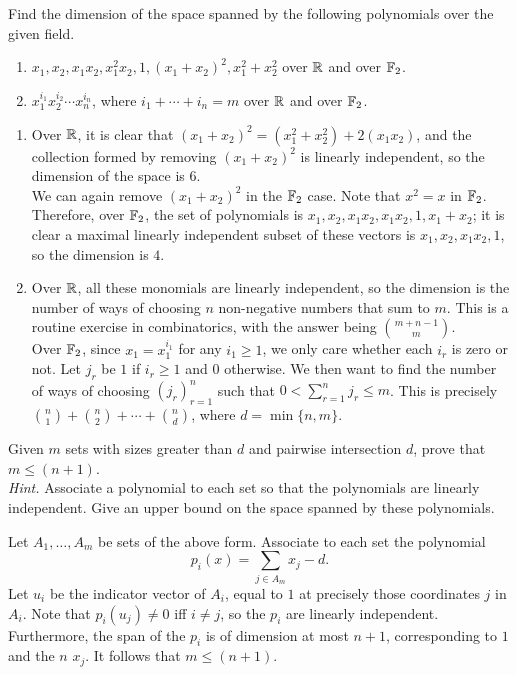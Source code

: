\documentclass{article}
\begin{document}
	\begin{exercise}
		\label{ex:2.1}
		Find the dimension of the space spanned by the following polynomials over the given field.
		\begin{enumerate}[label=(\alph*)]
			\item $x_1, x_2, x_1x_2, x_1^2x_2, 1, (x_1+x_2)^2, x_1^2+x_2^2$ over $\mathbb{R}$ and over $\mathbb{F}_2$.
			\item $x_1^{i_1}x_2^{i_2}\cdots x_n^{i_n}$, where $i_1 + \cdots + i_n = m$ over $\mathbb{R}$ and over $\mathbb{F}_2$.
		\end{enumerate}
	\end{exercise}
	\begin{solution*}
		\begin{enumerate}[label=(\alph*)]
			\item Over $\mathbb{R}$, it is clear that $(x_1 + x_2)^2 = (x_1^2 + x_2^2) + 2(x_1x_2)$, and the collection formed by removing $(x_1 + x_2)^2$ is linearly independent, so the dimension of the space is $6$.\\
			We can again remove $(x_1+x_2)^2$ in the $\mathbb{F}_2$ case. Note that $x^2 = x$ in $\mathbb{F}_2$. Therefore, over $\mathbb{F}_2$, the set of polynomials is $x_1, x_2, x_1x_2, x_1x_2, 1, x_1+x_2$; it is clear a maximal linearly independent subset of these vectors is $x_1, x_2, x_1x_2, 1$, so the dimension is $4$.

			\item Over $\mathbb{R}$, all these monomials are linearly independent, so the dimension is the number of ways of choosing $n$ non-negative numbers that sum to $m$. This is a routine exercise in combinatorics, with the answer being $\binom{m+n-1}{m}$.\\
			Over $\mathbb{F}_2$, since $x_1 = x_1^{i_1}$ for any $i_1 \ge 1$, we only care whether each $i_r$ is zero or not. Let $j_r$ be $1$ if $i_r \ge 1$ and $0$ otherwise. We then want to find the number of ways of choosing $(j_r)_{r=1}^n$ such that $0 < \sum_{r=1}^{n} j_r \le m$. This is precisely $\binom{n}{1} + \binom{n}{2} + \cdots + \binom{n}{d}$, where $d = \min\{n,m\}$.
		\end{enumerate}
	\end{solution*}

	\begin{exercise}
		Given $m$ sets with sizes greater than $d$ and pairwise intersection $d$, prove that $m \le (n+1)$.\\
		\emph{Hint.} \textcolor{gray!20}{Associate a polynomial to each set so that the polynomials are linearly independent. Give an upper bound on the space spanned by these polynomials.}
	\end{exercise}
	\begin{solution*}
		Let $A_1,\ldots,A_m$ be sets of the above form. Associate to each set the polynomial
		\[ p_i(x) = \sum_{j \in A_m} x_j - d. \]
		Let $u_i$ be the indicator vector of $A_i$, equal to $1$ at precisely those coordinates $j$ in $A_i$. Note that $p_i(u_j) \ne 0$ iff $i \ne j$, so the $p_i$ are linearly independent. Furthermore, the span of the $p_i$ is of dimension at most $n+1$, corresponding to $1$ and the $n$ $x_j$. It follows that $m \le (n+1)$.
	\end{solution*}
\end{document}
